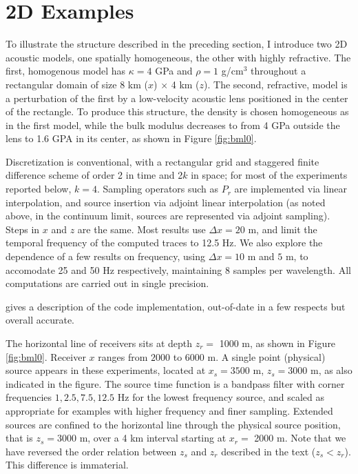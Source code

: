 \section{2D Examples}


To illustrate the structure described in the preceding section, I
introduce two 2D acoustic models, one spatially homogeneous, the other
with highly refractive. The first, homogenous model has $\kappa = 4$
GPa and $\rho = 1$ g/cm$^3$ throughout a rectangular domain of size 8 km ($x$) $\times$ 4 km
($z$). The second, refractive, model is a perturbation of the first by
a low-velocity acoustic lens positioned in the center of the
rectangle. To produce this structure, the density is chosen
homogeneous as in the first model, while the bulk modulus decreases to
from 4 GPa outside the lens to 1.6 GPA in its center, as shown in Figure \ref{fig:bml0}.

Discretization is conventional, with a rectangular grid and staggered
finite difference scheme \cite[]{Vir:84} of order 2 in time and
2$k$ in space; for most of the experiments reported below, $k=4$.
Sampling operators such as $P_r$ are implemented via linear
interpolation, and source insertion via adjoint linear interpolation
(as noted above, in the continuum limit, sources are represented via
adjoint sampling). Steps in $x$ and $z$ are the same. Most results use
$\Delta x = 20$ m, and limit the temporal frequency of the computed
traces to 12.5 Hz. We also explore the dependence of a few results on frequency, using
$\Delta x = 10$ m and $5$ m, to accomodate 25 and 50 Hz respectively,
maintaining 8 samples per wavelength. All computations are carried out
in single precision.

\cite{GeoPros:11} gives a description of the code
implementation, out-of-date in a few respects but overall accurate.

The horizontal line of receivers sits at depth $z_r = $ 1000 m, as
shown in Figure \ref{fig:bml0}. Receiver $x$ ranges from $2000$ to
$6000$ m. A single point (physical) source appears in these
experiments, located at $x_s=3500$ m, $z_s=3000$ m, as also indicated
in the figure. The source time function is a bandpass filter with
corner frequencies $1, 2.5, 7.5, 12.5$ Hz for the lowest frequency
source, and scaled as appropriate for examples with higher frequency
and finer sampling.  Extended sources are confined to the horizontal
line through the physical source position, that is $z_s = 3000$ m,
over a 4 km interval starting at $x_r=$ 2000 m. Note that we have
reversed the order relation between $z_s$ and $z_r$ described in the
text ($z_s<z_r$). This difference is immaterial.

